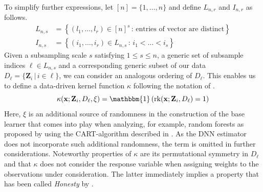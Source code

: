 \documentclass[letterpaper,10pt]{article}
\numberwithin{equation}{section}
\numberwithin{theorem}{section}
\theoremstyle{definition}
\newcommand{\1}{\mathbb{1}}
\begin{document}
To simplify further expressions, let $[n] = \{1, \dotsc, n\}$ and define $L_{n,r}$ and $I_{n,r}$ as follows.
\begin{align}
	L_{n,s} & = \left\{\left(l_1, \dotsc, l_r\right) \in [n]^{s} \, : \, \text{entries of vector are distinct} \right\} \\
	I_{n,s} & = \left\{\left(i_1, \dotsc, i_r\right) \in L_{n,s} \, : \, i_1 < \dotsc < i_s \right\}
\end{align}
Given a subsampling scale $s$ satisfying $1 \leq s \leq n$, a generic set of subsample indices $\ell \in L_{n,s}$ and a corresponding generic subset of our data $D_{\ell} = \{\mathbf{Z}_i \, | \, i \in \ell\}$, we can consider an analogous ordering of $D_{\ell}$.
This enables us to define a data-driven kernel function $\kappa$ following the notation of \citet{ritzwoller_uniform_2024}.
\begin{equation}
	\kappa(\mathbf{x}; \mathbf{Z}_i, D_{\ell}, \xi)
	= \mathbbm{1}\left(\operatorname{rk}(\mathbf{x}; \mathbf{Z}_i, D_{\ell}) = 1\right)
\end{equation}
Here, $\xi$ is an additional source of randomness in the construction of the base learner that comes into play when analyzing, for example, random forests as proposed by \citet{breiman_random_2001} using the CART-algorithm described in \citet{breiman_classification_2017}.
As the DNN estimator does not incorporate such additional randomness, the term is omitted in further considerations.
Noteworthy properties of $\kappa$ are its permutational symmetry in $D_{\ell}$ and that $\kappa$ does not consider the response variable when assigning weights to the observations under consideration.
The latter immediately implies a property that has been called \textit{Honesty} by \citet{wager_estimation_2018}.
\end{document}

